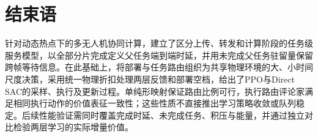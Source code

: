 \section{结束语}
针对动态热点下的多无人机协同计算，建立了区分上传、转发和计算阶段的任务级服务模型，以全部分片完成定义父任务端到端时延，并用未完成父任务驻留量保留跨帧等待信息。在此基础上，将部署与任务路由组织为共享物理环境的大、小时间尺度决策，采用统一物理折扣处理两层反馈和部署空档，给出了PPO与Direct SAC的采样、执行及更新过程。单纯形映射保证路由比例可行，执行路由评论家满足相同执行动作的价值表征一致性；这些性质不直接推出学习策略收敛或队列稳定。后续性能验证需同时覆盖完成时延、未完成任务、积压与能量，并通过独立对比检验两层学习的实际增量价值。
